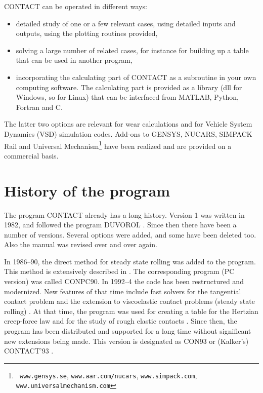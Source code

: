 \documentclass[12pt]{report}
\begin{document}
CONTACT can be operated in different ways:
\begin{itemize}
\item detailed study of one or a few relevant cases, using detailed inputs
        and outputs, using the plotting routines provided,
\item solving a large number of related cases, for instance for building up
        a table that can be used in another program,
\item incorporating the calculating part of CONTACT as a subroutine in your
        own computing software. The calculating part is provided as a
        library (dll for Windows, so for Linux) that can be interfaced from
        MATLAB, Python, Fortran and C.
\end{itemize}
The latter two options are relevant for wear calculations and for Vehicle
System Dynamics (VSD) simulation codes. Add-ons to GENSYS, NUCARS, SIMPACK
Rail \cite{Vollebregt2011b-iavsd2011} and Universal Mechanism\footnote{{\tt
www.gensys.se}, {\tt www.aar.com/nucars}, {\tt www.simpack.com}, {\tt 
www.universalmechanism.com}} have been realized and are provided on a
commercial basis.

\section{History of the program}

The program CONTACT already has a long history. Version 1 was written in
1982, and followed the program DUVOROL \cite{Kalker1979a,Tsjoeng1980}. Since
then there have been a number of versions. Several options were added, and
some have been deleted too. Also the manual was revised over and over again.

In 1986--90, the direct method for steady state rolling was added to the
program. This method is extensively described in \cite{Kalker1990}. The
corresponding program (PC version) was called CONPC90. In 1992--4 the code
has been restructured and modernized.  New features of that time include
fast solvers for the tangential contact problem
\cite{Vollebregt1995a-convexgs} and the extension to viscoelastic contact
problems (steady state rolling)
\cite{Wang_guangqiu1992b,Wang_guangqiu1993}. At that time, the program was
used for creating a table for the Hertzian creep-force law
\cite{Kalker1996b-usetab} and for the study of rough elastic contacts
\cite{Kalker1997}. Since then, the program has been distributed and
supported for a long time without significant new extensions being made.
This version is designated as CON93 or (Kalker's) CONTACT'93
\cite{Vollebregt1993f-con93}.
\end{document}
